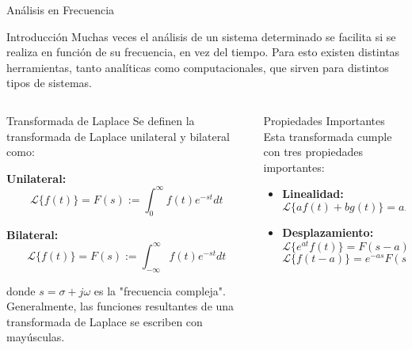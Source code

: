 \documentclass[
    10pt,
    aspectratio=169,
    xcolor={dvipsnames},
    spanish,
    ]{beamer}
\begin{document}
\begin{frame}{Análisis en Frecuencia}
\begin{block}{Introducción}
  \footnotesize
  Muchas veces el análisis de un sistema determinado se facilita si se realiza en función de su frecuencia, en vez del tiempo. Para esto existen distintas herramientas, tanto analíticas como computacionales, que sirven para distintos tipos de sistemas.
\end{block}

\begin{columns}
  \begin{column}{0.48\textwidth}
    \begin{block}{Transformada de Laplace}
      \footnotesize
      Se definen la transformada de Laplace unilateral y bilateral como:
      
      \textbf{Unilateral:} 
      $$\mathcal{L}\{f(t)\} = F(s) := \int_0^{\infty} f(t)e^{-st}dt$$
      
      \textbf{Bilateral:} 
      $$\mathcal{L}\{f(t)\} = F(s) := \int_{-\infty}^{\infty} f(t)e^{-st}dt$$
      
      donde $s = \sigma + j\omega$ es la "frecuencia compleja". Generalmente, las funciones resultantes de una transformada de Laplace se escriben con mayúsculas.
    \end{block}
  \end{column}
  
  \begin{column}{0.48\textwidth}
    \begin{block}{Propiedades Importantes}
      \footnotesize
      Esta transformada cumple con tres propiedades importantes:
      \begin{itemize}
        \item \textbf{Linealidad:} 
        $$\mathcal{L}\{af(t) + bg(t)\} = aF(s) + bG(s)$$
        \item \textbf{Desplazamiento:} 
        $$\mathcal{L}\{e^{at}f(t)\} = F(s-a)$$
        $$\mathcal{L}\{f(t-a)\} = e^{-as}F(s)$$
      \end{itemize}
    \end{block}
  \end{column}
\end{columns}
\end{frame}
\end{document}
